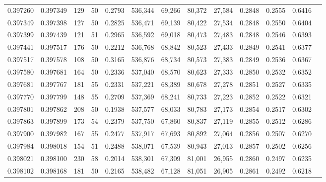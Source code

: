 \begin{tabular}{rrrrrrrrrrrrr}
0.397260 & 0.397349 &   129 &  50 &                                     0.2793 & 536,344 &  69,266 &  80,372 &  27,584 & 0.2848 & 0.2555 & 0.6416 \\
0.397349 & 0.397398 &   127 &  50 &                                     0.2825 & 536,471 &  69,139 &  80,422 &  27,534 & 0.2848 & 0.2550 & 0.6404 \\
0.397399 & 0.397439 &   121 &  51 &                                     0.2965 & 536,592 &  69,018 &  80,473 &  27,483 & 0.2848 & 0.2546 & 0.6393 \\
0.397441 & 0.397517 &   176 &  50 &                                     0.2212 & 536,768 &  68,842 &  80,523 &  27,433 & 0.2849 & 0.2541 & 0.6377 \\
0.397517 & 0.397578 &   108 &  50 &                                     0.3165 & 536,876 &  68,734 &  80,573 &  27,383 & 0.2849 & 0.2536 & 0.6367 \\
0.397580 & 0.397681 &   164 &  50 &                                     0.2336 & 537,040 &  68,570 &  80,623 &  27,333 & 0.2850 & 0.2532 & 0.6352 \\
0.397681 & 0.397767 &   181 &  55 &                                     0.2331 & 537,221 &  68,389 &  80,678 &  27,278 & 0.2851 & 0.2527 & 0.6335 \\
0.397770 & 0.397799 &   148 &  55 &                                     0.2709 & 537,369 &  68,241 &  80,733 &  27,223 & 0.2852 & 0.2522 & 0.6321 \\
0.397801 & 0.397862 &   208 &  50 &                                     0.1938 & 537,577 &  68,033 &  80,783 &  27,173 & 0.2854 & 0.2517 & 0.6302 \\
0.397863 & 0.397899 &   173 &  54 &                                     0.2379 & 537,750 &  67,860 &  80,837 &  27,119 & 0.2855 & 0.2512 & 0.6286 \\
0.397900 & 0.397982 &   167 &  55 &                                     0.2477 & 537,917 &  67,693 &  80,892 &  27,064 & 0.2856 & 0.2507 & 0.6270 \\
0.397984 & 0.398018 &   154 &  51 &                                     0.2488 & 538,071 &  67,539 &  80,943 &  27,013 & 0.2857 & 0.2502 & 0.6256 \\
0.398021 & 0.398100 &   230 &  58 &                                     0.2014 & 538,301 &  67,309 &  81,001 &  26,955 & 0.2860 & 0.2497 & 0.6235 \\
0.398102 & 0.398168 &   181 &  50 &                                     0.2165 & 538,482 &  67,128 &  81,051 &  26,905 & 0.2861 & 0.2492 & 0.6218 \\

\end{tabular}
